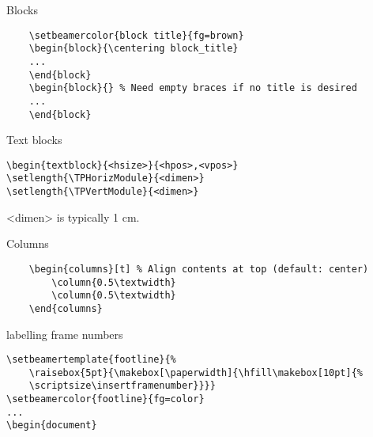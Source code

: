 \documentclass[9pt]{beamer}
\begin{document}
\begin{frame}[fragile=singleslide]{Blocks}
    \begin{verbatim}
    \setbeamercolor{block title}{fg=brown}
    \begin{block}{\centering block_title}
    ...
    \end{block}
    \begin{block}{} % Need empty braces if no title is desired
    ...
    \end{block}
    \end{verbatim}
\end{frame}

\begin{frame}[fragile=singleslide]{Text blocks}
\begin{verbatim}
\begin{textblock}{<hsize>}{<hpos>,<vpos>}
\setlength{\TPHorizModule}{<dimen>}
\setlength{\TPVertModule}{<dimen>}
\end{verbatim}
<dimen> is typically 1 cm.
\end{frame}%

\begin{frame}[fragile=singleslide]{Columns}
    \begin{verbatim}
    \begin{columns}[t] % Align contents at top (default: center)
        \column{0.5\textwidth}
        \column{0.5\textwidth}
    \end{columns}
    \end{verbatim}
\end{frame}%

\begin{frame}[fragile=singleslide]{labelling frame numbers}
    \begin{verbatim}
\setbeamertemplate{footline}{%
    \raisebox{5pt}{\makebox[\paperwidth]{\hfill\makebox[10pt]{%
    \scriptsize\insertframenumber}}}}
\setbeamercolor{footline}{fg=color}
...
\begin{document}
    \end{verbatim}
\end{frame}%
\end{document}
